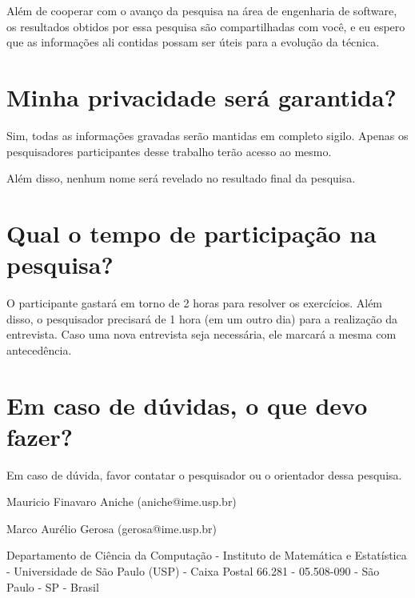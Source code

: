 Além de cooperar com o avanço da pesquisa na área de engenharia de software, os
resultados obtidos por essa pesquisa são compartilhadas com você, e eu espero
que as informações ali contidas possam ser úteis para a evolução da técnica.

\section{Minha privacidade será garantida?}

Sim, todas as informações gravadas serão mantidas em completo sigilo. Apenas os
pesquisadores participantes desse trabalho terão acesso ao mesmo.

Além disso, nenhum nome será revelado no resultado final da pesquisa.

\section{Qual o tempo de participação na pesquisa?}

O participante gastará em torno de 2 horas para resolver os exercícios.
Além disso, o pesquisador precisará de 1 hora (em um outro dia) para a realização da entrevista. 
Caso uma nova entrevista seja necessária, ele marcará a mesma com antecedência. 

\section{Em caso de dúvidas, o que devo fazer?}

Em caso de dúvida, favor contatar o pesquisador ou o orientador dessa pesquisa.

Mauricio Finavaro Aniche (aniche@ime.usp.br)

Marco Aurélio Gerosa (gerosa@ime.usp.br) 

Departamento de Ciência da Computação - Instituto de Matemática e Estatística - 
Universidade de São Paulo (USP) - Caixa Postal 66.281 - 05.508-090 - São Paulo -
SP  - Brasil

